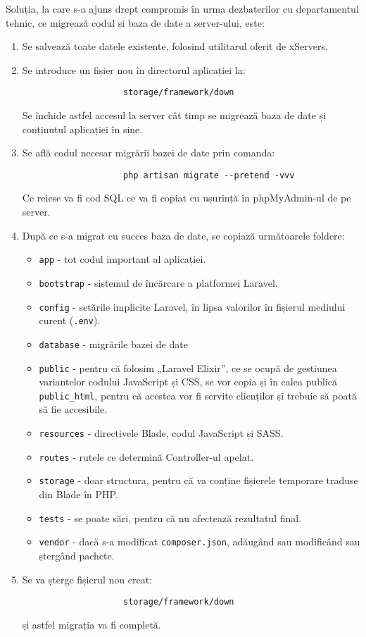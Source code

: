 		Soluția, la care s-a ajuns drept compromis în urma dezbaterilor cu departamentul tehnic, ce migrează codul și baza de date a server-ului, este:
		\begin{enumerate}
			\item
				Se salvează toate datele existente, folosind utilitarul oferit de xServers.
			\item
				Se introduce un fișier nou în directorul aplicației la:
				\begin{verbatim}
					storage/framework/down
				\end{verbatim}
				Se închide astfel accesul la server cât timp se migrează baza de date și conținutul aplicației în sine.
			\item
				Se află codul necesar migrării bazei de date prin comanda:
				\begin{verbatim}
					php artisan migrate --pretend -vvv
				\end{verbatim}
				Ce reiese va fi cod SQL ce va fi copiat cu ușurință în phpMyAdmin-ul de pe server.
			\item
				După ce s-a migrat cu succes baza de date, se copiază următoarele foldere:
					\begin{itemize}
						\item \verb|app| - tot codul important al aplicației.
						\item \verb|bootstrap| - sistemul de încărcare a platformei Laravel.
						\item \verb|config| - setările implicite Laravel, în lipsa valorilor în fișierul mediului curent (\verb|.env|).
						\item \verb|database| - migrările bazei de date
						\item \verb|public| - pentru că folosim „Laravel Elixir”, ce se ocupă de gestiunea variantelor codului JavaScript și CSS, se vor copia și în calea publică \verb|public_html|, pentru că acestea vor fi servite clienților și trebuie să poată să fie accesibile.
						\item \verb|resources| - directivele Blade, codul JavaScript și SASS.
						\item \verb|routes| - rutele ce determină Controller-ul apelat.
						\item \verb|storage| - doar structura, pentru că va conține fișierele temporare traduse din Blade în PHP.
						\item \verb|tests| - se poate sări, pentru că nu afectează rezultatul final.
						\item \verb|vendor| - dacă s-a modificat \verb|composer.json|, adăugând sau modificând sau ștergând pachete.
					\end{itemize}
			\item
				Se va șterge fișierul nou creat:
				\begin{verbatim}
					storage/framework/down
				\end{verbatim}
				și astfel migrația va fi completă.
		\end{enumerate}

